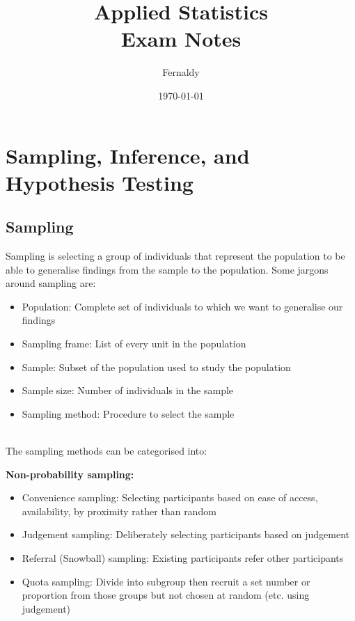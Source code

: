 \documentclass{article}
\title{Applied Statistics\\Exam Notes}
\author{Fernaldy}
\date{\today}
\begin{document}
\maketitle

\section{Sampling, Inference, and Hypothesis Testing}
\subsection{Sampling}
Sampling is selecting a group of individuals that represent the population to be able to generalise findings from the sample to the population. Some jargons around sampling are:

\begin{itemize}
    \item Population: Complete set of individuals to which we want to generalise our findings
    \item Sampling frame: List of every unit in the population
    \item Sample: Subset of the population used to study the population
    \item Sample size: Number of individuals in the sample
    \item Sampling method: Procedure to select the sample
\end{itemize}
\mbox{}\\
The sampling methods can be categorised into:

\textbf{Non-probability sampling:}
\begin{itemize}
    \item Convenience sampling: Selecting participants based on ease of access, availability, by proximity rather than random
    \item Judgement sampling: Deliberately selecting participants based on judgement
    \item Referral (Snowball) sampling: Existing participants refer other participants
    \item Quota sampling: Divide into subgroup then recruit a set number or proportion from those groups but not chosen at random (etc. using judgement)
\end{itemize}
\end{document}
